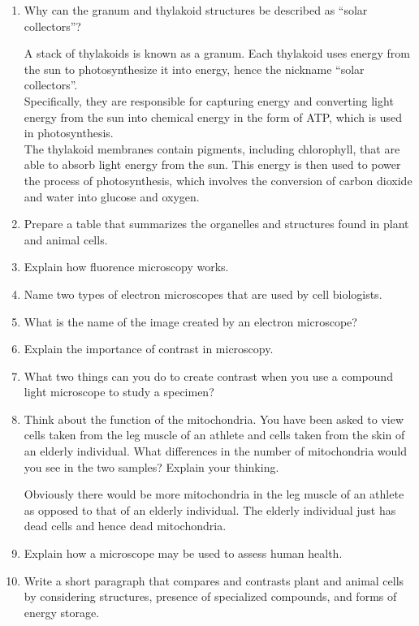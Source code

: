 \documentclass[12pt]{report}
\begin{document}
\begin{enumerate}
    \item{Why can the granum and thylakoid structures be described as ``solar collectors''?}
        \begin{solution}
            A stack of thylakoids is known as a granum. Each thylakoid uses energy from the sun to photosynthesize it into energy, hence the nickname ``solar collectors''.\\ 

        Specifically, they are responsible for capturing energy and converting light energy from the sun into chemical energy in the form of ATP, which is used in photosynthesis.\\ 

        The thylakoid membranes contain pigments, including chlorophyll, that are able to absorb light energy from the sun. This energy is then used to power the process of photosynthesis, which involves the conversion of carbon dioxide and water into glucose and oxygen.
        \end{solution}

    \item{Prepare a table that summarizes the organelles and structures found in plant and animal cells.}

    \item{Explain how fluorence microscopy works.}

    \item{Name two types of electron microscopes that are used by cell biologists.}

    \item{What is the name of the image created by an electron microscope?}

    \item{Explain the importance of contrast in microscopy.}

    \item{What two things can you do to create contrast when you use a compound light microscope to study a specimen?}

    \item{Think about the function of the mitochondria. You have been asked to view cells taken from the leg muscle of an athlete and cells taken from the skin of an elderly individual. What differences in the number of mitochondria would you see in the two samples? Explain your thinking.}
        \begin{solution}
            Obviously there would be more mitochondria in the leg muscle of an athlete as opposed to that of an elderly individual. The elderly individual just has dead cells and hence dead mitochondria.
        \end{solution}

    \item{Explain how a microscope may be used to assess human health.}

    \item{Write a short paragraph that compares and contrasts plant and animal cells by considering structures, presence of specialized compounds, and forms of energy storage.}
\end{enumerate}
\end{document}

